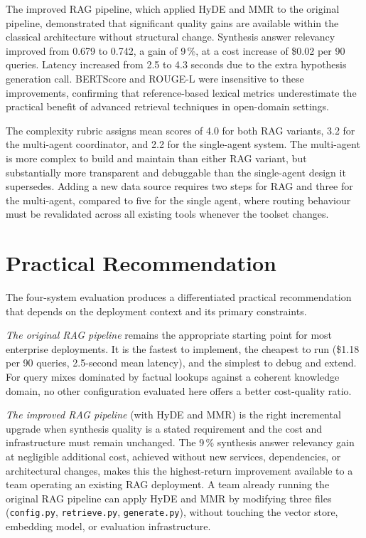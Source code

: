 The improved RAG pipeline, which applied HyDE and MMR to the original pipeline, demonstrated that significant quality gains are available within the classical architecture without structural change. Synthesis answer relevancy improved from 0.679 to 0.742, a gain of 9\,\%, at a cost increase of \$0.02 per 90 queries. Latency increased from 2.5 to 4.3 seconds due to the extra hypothesis generation call. BERTScore and ROUGE-L were insensitive to these improvements, confirming that reference-based lexical metrics underestimate the practical benefit of advanced retrieval techniques in open-domain settings.

The complexity rubric assigns mean scores of 4.0 for both RAG variants, 3.2 for the multi-agent coordinator, and 2.2 for the single-agent system. The multi-agent is more complex to build and maintain than either RAG variant, but substantially more transparent and debuggable than the single-agent design it supersedes. Adding a new data source requires two steps for RAG and three for the multi-agent, compared to five for the single agent, where routing behaviour must be revalidated across all existing tools whenever the toolset changes.


\section{Practical Recommendation}

The four-system evaluation produces a differentiated practical recommendation that depends on the deployment context and its primary constraints.

\textit{The original RAG pipeline} remains the appropriate starting point for most enterprise deployments. It is the fastest to implement, the cheapest to run (\$1.18 per 90 queries, 2.5-second mean latency), and the simplest to debug and extend. For query mixes dominated by factual lookups against a coherent knowledge domain, no other configuration evaluated here offers a better cost-quality ratio.

\textit{The improved RAG pipeline} (with HyDE and MMR) is the right incremental upgrade when synthesis quality is a stated requirement and the cost and infrastructure must remain unchanged. The 9\,\% synthesis answer relevancy gain at negligible additional cost, achieved without new services, dependencies, or architectural changes, makes this the highest-return improvement available to a team operating an existing RAG deployment. A team already running the original RAG pipeline can apply HyDE and MMR by modifying three files (\texttt{config.py}, \texttt{retrieve.py}, \texttt{generate.py}), without touching the vector store, embedding model, or evaluation infrastructure.


